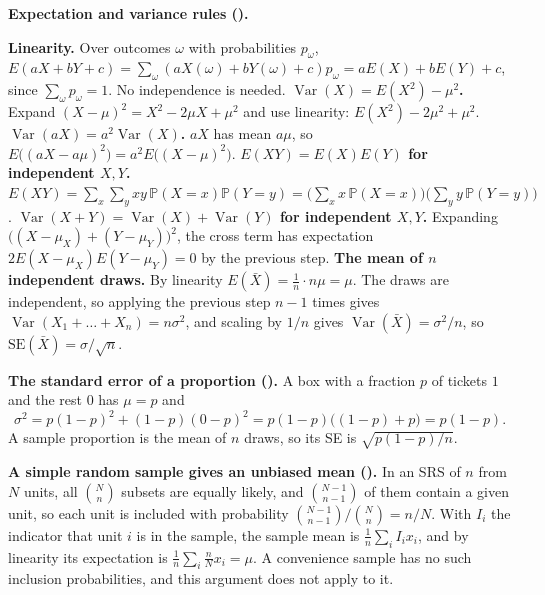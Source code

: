 \documentclass[10pt]{scrartcl}
\begin{document}
\textbf{Expectation and variance rules ().}
\begin{steps}
  \ii \textbf{Linearity.} Over outcomes $\omega$ with probabilities $p_\omega$, $E(aX + bY + c) = \sum_\omega (aX(\omega) + bY(\omega) + c)p_\omega = aE(X) + bE(Y) + c$, since $\sum_\omega p_\omega = 1$. No independence is needed.
  \ii \textbf{$\operatorname{Var}(X) = E(X^2) - \mu^2$.} Expand $(X - \mu)^2 = X^2 - 2\mu X + \mu^2$ and use linearity: $E(X^2) - 2\mu^2 + \mu^2$.
  \ii \textbf{$\operatorname{Var}(aX) = a^2\operatorname{Var}(X)$.} $aX$ has mean $a\mu$, so $E\big((aX - a\mu)^2\big) = a^2E\big((X-\mu)^2\big)$.
  \ii \textbf{$E(XY) = E(X)E(Y)$ for independent $X, Y$.} $E(XY) = \sum_x\sum_y xy\,\mathbb P(X=x)\mathbb P(Y=y) = \big(\sum_x x\,\mathbb P(X=x)\big)\big(\sum_y y\,\mathbb P(Y=y)\big)$.
  \ii \textbf{$\operatorname{Var}(X+Y) = \operatorname{Var}(X) + \operatorname{Var}(Y)$ for independent $X, Y$.} Expanding $\big((X - \mu_X) + (Y - \mu_Y)\big)^2$, the cross term has expectation $2E(X - \mu_X)E(Y - \mu_Y) = 0$ by the previous step.
  \ii \textbf{The mean of $n$ independent draws.} By linearity $E(\bar X) = \frac1n\cdot n\mu = \mu$. The draws are independent, so applying the previous step $n-1$ times gives $\operatorname{Var}(X_1 + \dots + X_n) = n\sigma^2$, and scaling by $1/n$ gives $\operatorname{Var}(\bar X) = \sigma^2/n$, so $\mathrm{SE}(\bar X) = \sigma/\sqrt n$.
\end{steps}

\textbf{The standard error of a proportion ().} A box with a fraction $p$ of tickets $1$ and the rest $0$ has $\mu = p$ and
\[
  \sigma^2 = p(1-p)^2 + (1-p)(0-p)^2 = p(1-p)\big((1-p) + p\big) = p(1-p).
\]
A sample proportion is the mean of $n$ draws, so its SE is $\sqrt{p(1-p)/n}$.

\textbf{A simple random sample gives an unbiased mean ().} In an SRS of $n$ from $N$ units, all $\binom Nn$ subsets are equally likely, and $\binom{N-1}{n-1}$ of them contain a given unit, so each unit is included with probability $\binom{N-1}{n-1}/\binom Nn = n/N$. With $I_i$ the indicator that unit $i$ is in the sample, the sample mean is $\frac1n\sum_i I_i x_i$, and by linearity its expectation is $\frac1n\sum_i \frac nN x_i = \mu$. A convenience sample has no such inclusion probabilities, and this argument does not apply to it.
\end{document}
